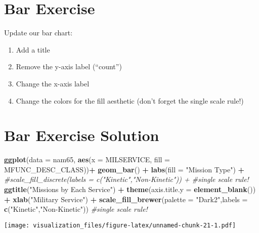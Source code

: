 \documentclass[oneside]{memoir}
\newenvironment{Shaded}{\begin{snugshade}}{\end{snugshade}}
\newcommand{\KeywordTok}[1]{\textcolor[rgb]{0.13,0.29,0.53}{\textbf{#1}}}
\newcommand{\DataTypeTok}[1]{\textcolor[rgb]{0.13,0.29,0.53}{#1}}
\newcommand{\StringTok}[1]{\textcolor[rgb]{0.31,0.60,0.02}{#1}}
\newcommand{\CommentTok}[1]{\textcolor[rgb]{0.56,0.35,0.01}{\textit{#1}}}
\newcommand{\OperatorTok}[1]{\textcolor[rgb]{0.81,0.36,0.00}{\textbf{#1}}}
\newcommand{\NormalTok}[1]{#1}
\theoremstyle{definition}
\theoremstyle{definition}
\theoremstyle{definition}
\theoremstyle{remark}
\begin{document}
\section{Bar Exercise}\label{bar-exercise}

Update our bar chart:

\begin{enumerate}
\def\labelenumi{\arabic{enumi}.}
\item
  Add a title
\item
  Remove the y-axis label (``count'')
\item
  Change the x-axis label
\item
  Change the colors for the fill aesthetic (don't forget the single
  scale rule!)
\end{enumerate}

\section{Bar Exercise Solution}\label{bar-exercise-solution}

\begin{Shaded}
\begin{Highlighting}[]
\KeywordTok{ggplot}\NormalTok{(}\DataTypeTok{data =}\NormalTok{ nam65, }\KeywordTok{aes}\NormalTok{(}\DataTypeTok{x =}\NormalTok{ MILSERVICE, }\DataTypeTok{fill =}\NormalTok{ MFUNC_DESC_CLASS))}\OperatorTok{+}
\StringTok{  }\KeywordTok{geom_bar}\NormalTok{() }\OperatorTok{+}
\StringTok{  }\KeywordTok{labs}\NormalTok{(}\DataTypeTok{fill =} \StringTok{"Mission Type"}\NormalTok{) }\OperatorTok{+}
\StringTok{  }\CommentTok{#scale_fill_discrete(labels = c("Kinetic","Non-Kinetic")) +      #single scale rule!}
\StringTok{  }\KeywordTok{ggtitle}\NormalTok{(}\StringTok{"Missions by Each Service"}\NormalTok{) }\OperatorTok{+}
\StringTok{  }\KeywordTok{theme}\NormalTok{(}\DataTypeTok{axis.title.y =} \KeywordTok{element_blank}\NormalTok{()) }\OperatorTok{+}
\StringTok{  }\KeywordTok{xlab}\NormalTok{(}\StringTok{"Military Service"}\NormalTok{) }\OperatorTok{+}
\StringTok{  }\KeywordTok{scale_fill_brewer}\NormalTok{(}\DataTypeTok{palette =} \StringTok{"Dark2"}\NormalTok{,}\DataTypeTok{labels =} \KeywordTok{c}\NormalTok{(}\StringTok{"Kinetic"}\NormalTok{,}\StringTok{"Non-Kinetic"}\NormalTok{))   }\CommentTok{#single scale rule!}
\end{Highlighting}
\end{Shaded}

\texttt{[image: visualization\_files/figure-latex/unnamed-chunk-21-1.pdf]}
\end{document}
